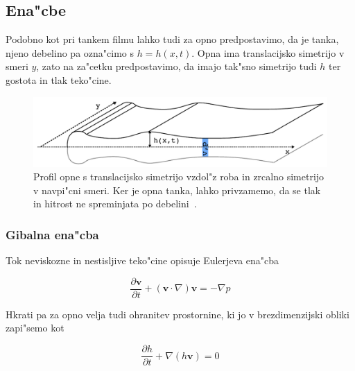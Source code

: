 \documentclass[a4paper,10pt]{article}
\renewcommand{\vec}{\mathbf}
\newcommand{\odv}[1]{\frac{\partial #1}{\partial t}}
\begin{document}
\subsection{Ena"cbe}

Podobno kot pri tankem filmu lahko tudi za opno predpostavimo, da je tanka, njeno debelino pa ozna"cimo s $h = h(x,t)$. Opna ima translacijsko simetrijo v smeri $y$, zato na za"cetku predpostavimo, da imajo tak"sno simetrijo tudi $h$ ter gostota in tlak teko"cine. 

\begin{figure}
 \centering
\includegraphics[width=.8\textwidth]{./Slike/mehurcek-skica}
\caption{Profil opne s translacijsko simetrijo vzdol"z roba in zrcalno simetrijo v navpi"cni smeri. Ker je opna tanka, lahko privzamemo, da se tlak in hitrost ne spreminjata po debelini~\cite{diploma}. }
\label{mehurcek-skica}
\end{figure}

\subsubsection{Gibalna ena"cba}

Tok neviskozne in nestisljive teko"cine opisuje Eulerjeva ena"cba

\begin{equation}
\label{eq:meh-euler}
 \odv{\vec v} + (\vec v \cdot \nabla)\vec v = - \nabla p
\end{equation}

Hkrati pa za opno velja tudi ohranitev prostornine, ki jo v brezdimenzijski obliki zapi"semo kot

\begin{equation}
\label{eq:meh-ohranitev}
 \odv{h} + \nabla (h\vec v) = 0
\end{equation}
\end{document}
